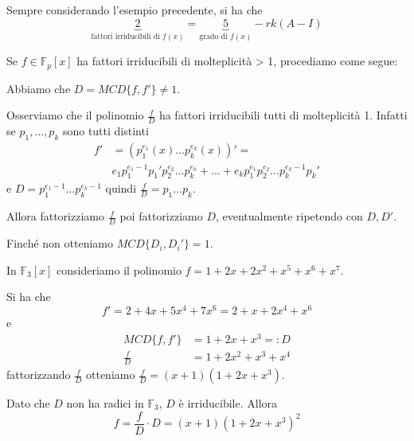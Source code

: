 \documentclass[../main.tex]{subfiles}
\begin{document}
\begin{example}
    Sempre considerando l'esempio precedente, si ha che
    \begin{equation*}
        \underbrace{2}_{\text{fattori irriducibili di $f(x)$}} = \underbrace{5}_{\text{grado di $f(x)$}} - rk(A - I)
    \end{equation*}
\end{example}

Se $f \in \mathbb{F}_p[x]$ ha fattori irriducibili di molteplicità > 1, procediamo come segue:

Abbiamo che $D = MCD\{f, f'\} \neq 1$.

Osserviamo che il polinomio $\frac{f}{D}$ ha fattori irriducibili tutti di molteplicità 1. Infatti se $p_1, \ldots , p_k$ sono tutti distinti
\begin{align*}
    f' & = (p_1^{e_1}(x) \ldots p_k^{e_k}(x))' =                                                                     \\
       & e_1 p_1^{e_1 - 1} p_1'p_2^{e_2} \ldots p_k^{e_k} + \ldots + e_k p_1^{e_1}p_2^{e_2} \ldots p_k^{e_k - 1}p_k'
\end{align*}
e $D = p_1^{e_1 - 1} \ldots p_k^{e_k - 1}$ quindi $\frac{f}{D} = p_1 \ldots p_k$.

Allora fattorizziamo $\frac{f}{D}$ poi fattorizziamo $D$, eventualmente ripetendo con $D, D'$.

Finché non otteniamo $MCD\{ D_i, D_i'\} = 1$.

\begin{example}
    In $\mathbb{F}_3[x]$ consideriamo il polinomio $f = 1 + 2x + 2x^2 + x^5 + x^6 + x^7$.

    Si ha che
    \begin{equation*}
        f' = 2 + 4x + 5x^4 + 7x^6 = 2 + x + 2x^4 + x^6
    \end{equation*}
    e
    \begin{align*}
        MCD\{f, f'\} & = 1 + 2x + x^3 =: D    \\
        \frac{f}{D}  & = 1 + 2x^2 + x^3 + x^4
    \end{align*}
    fattorizzando $\frac{f}{D}$ otteniamo $\frac{f}{D} = (x + 1)(1 + 2x+x^3)$.

    Dato che $D$ non ha radici in $\mathbb{F}_3$, $D$ è irriducibile. Allora
    \begin{equation*}
        f = \frac{f}{D} \cdot D = (x + 1)(1 + 2x + x^3)^2
    \end{equation*}
\end{example}
\end{document}
